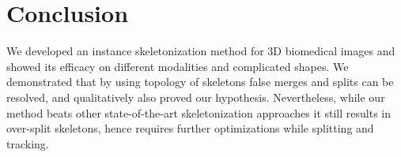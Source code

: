 
\chapter{Conclusion}\label{chapter:conclusion}

We developed an instance skeletonization method for 3D biomedical images and showed its efficacy on different modalities and complicated shapes.
We demonstrated that by using topology of skeletons false merges and splits can be resolved, and qualitatively also proved our hypothesis. Nevertheless, while our method beats other state-of-the-art skeletonization approaches it still results in over-split skeletons, hence requires further optimizations while splitting and tracking.